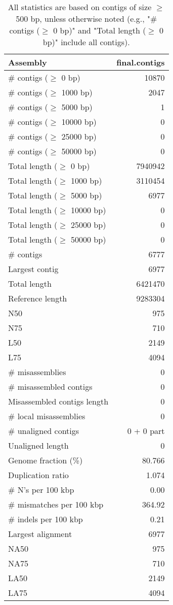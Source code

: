 \documentclass[12pt,a4paper]{article}
\begin{document}
\begin{table}[ht]
\begin{center}
\caption{All statistics are based on contigs of size $\geq$ 500 bp, unless otherwise noted (e.g., "\# contigs ($\geq$ 0 bp)" and "Total length ($\geq$ 0 bp)" include all contigs).}
\begin{tabular}{|l*{1}{|r}|}
\hline
Assembly & final.contigs \\ \hline
\# contigs ($\geq$ 0 bp) & 10870 \\ \hline
\# contigs ($\geq$ 1000 bp) & 2047 \\ \hline
\# contigs ($\geq$ 5000 bp) & 1 \\ \hline
\# contigs ($\geq$ 10000 bp) & 0 \\ \hline
\# contigs ($\geq$ 25000 bp) & 0 \\ \hline
\# contigs ($\geq$ 50000 bp) & 0 \\ \hline
Total length ($\geq$ 0 bp) & 7940942 \\ \hline
Total length ($\geq$ 1000 bp) & 3110454 \\ \hline
Total length ($\geq$ 5000 bp) & 6977 \\ \hline
Total length ($\geq$ 10000 bp) & 0 \\ \hline
Total length ($\geq$ 25000 bp) & 0 \\ \hline
Total length ($\geq$ 50000 bp) & 0 \\ \hline
\# contigs & 6777 \\ \hline
Largest contig & 6977 \\ \hline
Total length & 6421470 \\ \hline
Reference length & 9283304 \\ \hline
N50 & 975 \\ \hline
N75 & 710 \\ \hline
L50 & 2149 \\ \hline
L75 & 4094 \\ \hline
\# misassemblies & 0 \\ \hline
\# misassembled contigs & 0 \\ \hline
Misassembled contigs length & 0 \\ \hline
\# local misassemblies & 0 \\ \hline
\# unaligned contigs & 0 + 0 part \\ \hline
Unaligned length & 0 \\ \hline
Genome fraction (\%) & 80.766 \\ \hline
Duplication ratio & 1.074 \\ \hline
\# N's per 100 kbp & 0.00 \\ \hline
\# mismatches per 100 kbp & 364.92 \\ \hline
\# indels per 100 kbp & 0.21 \\ \hline
Largest alignment & 6977 \\ \hline
NA50 & 975 \\ \hline
NA75 & 710 \\ \hline
LA50 & 2149 \\ \hline
LA75 & 4094 \\ \hline
\end{tabular}
\end{center}
\end{table}
\end{document}
